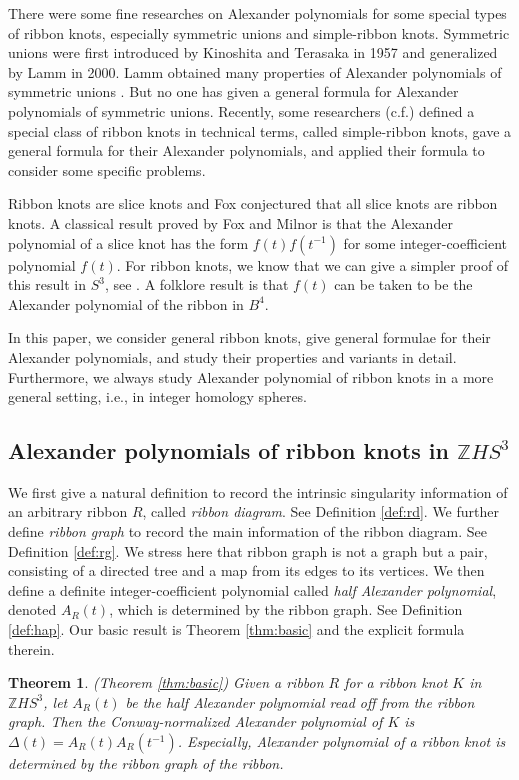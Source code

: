 \documentclass{amsart}
\newtheorem{thm}{Theorem}[subsection]
\theoremstyle{definition}
\theoremstyle{remark}
\numberwithin{equation}{subsection}
\begin{document}
There were some fine researches on Alexander polynomials for some special types of ribbon knots, especially symmetric unions and simple-ribbon knots. Symmetric unions were first introduced by Kinoshita and Terasaka\cite{KinoshitaTerasaka1957} in 1957 and generalized by Lamm\cite{Lamm2000} in 2000. Lamm obtained many properties of Alexander polynomials of symmetric unions \cite{Lamm2000}. But no one has given a general formula for Alexander polynomials of symmetric unions. Recently, some researchers (c.f.\cite{KishimotoShibuyaTsukamotoIshikawa2021}) defined a special class of ribbon knots in technical terms, called simple-ribbon knots, gave a general formula for their Alexander polynomials, and applied their formula to consider some specific problems.

Ribbon knots are slice knots and Fox conjectured that all slice knots are ribbon knots. 
A classical result proved by Fox and Milnor\cite{FoxMilnor} is that the Alexander polynomial of a slice knot has the form $f(t)f(t^{-1})$ for some integer-coefficient polynomial $f(t)$. 
For ribbon knots, we know that we can give a simpler proof of this result in $S^3$, see \cite{Kauffman1987}. 
A folklore result is that $f(t)$ can be taken to be the Alexander polynomial of the ribbon in $ B^4 $.

In this paper, we consider general ribbon knots, give general formulae for their Alexander polynomials, and study their properties and variants in detail. Furthermore, we always study Alexander polynomial of ribbon knots in a more general setting, i.e., in integer homology spheres.

\subsection{Alexander polynomials of ribbon knots in $ \mathbb{Z}HS^3 $}\label{subsect:introduction1}

We first give a natural definition to record the intrinsic singularity information of an arbitrary ribbon $ R $, called \emph{ribbon diagram}. See Definition \ref{def:rd}. 
We further define \emph{ribbon graph} to record the main information of the ribbon diagram. See Definition \ref{def:rg}. We stress here that ribbon graph is not a graph but a pair,  consisting of a directed tree and a map from its edges to its vertices. 
We then define a definite integer-coefficient polynomial called \emph{half Alexander polynomial}, denoted $ A_R (t) $, which is determined by the ribbon graph. See Definition \ref{def:hap}. 
Our basic result is Theorem \ref{thm:basic} and the explicit formula therein.
\begin{thm}\label{thm:rawalgo0} (Theorem \ref{thm:basic})
Given a ribbon $ R $ for a ribbon knot $ K $ in $ \mathbb{Z}HS^3 $, let $ A_R (t) $ be the half Alexander polynomial read off from the ribbon graph. Then the Conway-normalized Alexander polynomial of $ K $ is $ \Delta (t) = A_R (t)   A_R (t^{-1}) $. 
Especially, Alexander polynomial of a ribbon knot is determined by the ribbon graph of the ribbon.
\end{thm}
\end{document}
